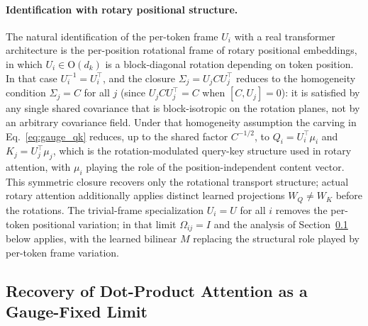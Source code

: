 \paragraph{Identification with rotary positional structure.}
The natural identification of the per-token frame $U_i$ with a real transformer architecture is the per-position rotational frame of rotary positional embeddings, in which $U_i \in \mathrm{O}(d_k)$ is a block-diagonal rotation depending on token position. In that case $U_i^{-1} = U_i^\top$, and the closure $\Sigma_j = U_j C U_j^\top$ reduces to the homogeneity condition $\Sigma_j = C$ for all $j$ (since $U_j C U_j^\top = C$ when $[C, U_j] = 0$): it is satisfied by any single shared covariance that is block-isotropic on the rotation planes, not by an arbitrary covariance field. Under that homogeneity assumption the carving in Eq.~\eqref{eq:gauge_qk} reduces, up to the shared factor $C^{-1/2}$, to $Q_i = U_i^\top\mu_i$ and $K_j = U_j^\top\mu_j$, which is the rotation-modulated query-key structure used in rotary attention, with $\mu_i$ playing the role of the position-independent content vector. This symmetric closure recovers only the rotational transport structure; actual rotary attention additionally applies distinct learned projections $W_Q \neq W_K$ before the rotations. The trivial-frame specialization $U_i = U$ for all $i$ removes the per-token positional variation; in that limit $\Omega_{ij} = I$ and the analysis of Section~\ref{sec:dot_product_derivation} below applies, with the learned bilinear $M$ replacing the structural role played by per-token frame variation.

\subsection{Recovery of Dot-Product Attention as a Gauge-Fixed Limit}
\label{sec:dot_product_derivation}

